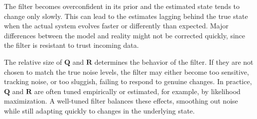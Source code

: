 The filter becomes overconfident in its prior and the estimated state tends to change only slowly. This can lead to the estimates lagging behind the true state when the actual system evolves faster or differently than expected. Major differences between the model and reality might not be corrected quickly, since the filter is resistant to trust incoming data. 

The relative size of $\mathbf{Q}$ and $\mathbf{R}$ determines the behavior of the filter. If they are not chosen to match the true noise levels, the filter may either become too sensitive, tracking noise, or too sluggish, failing to respond to genuine changes. In practice, $\mathbf{Q}$ and $\mathbf{R}$ are often tuned empirically or estimated, for example, by likelihood maximization. A well-tuned filter balances these effects, smoothing out noise while still adapting quickly to changes in the underlying state.

